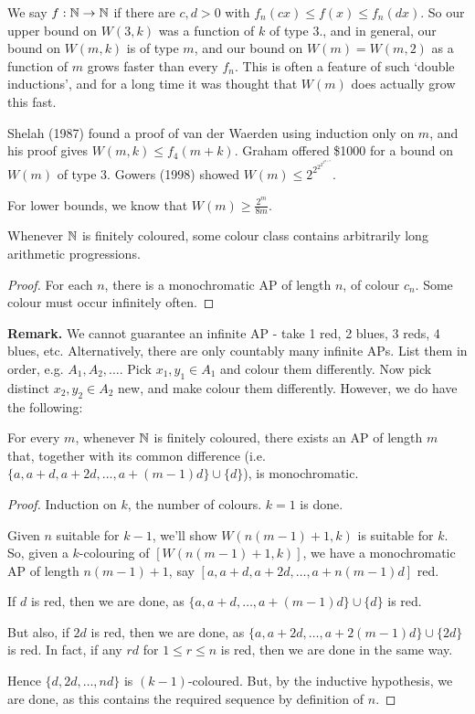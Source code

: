 \documentclass[10pt,a4paper]{article}
\begin{document}
We say $f:\mathbb{N} \to \mathbb{N}$ if there are $c, d >0$ with $f_n(cx) \leq f(x) \leq f_n(dx)$. So our upper bound on $W(3, k)$ was a function of $k$ of type 3., and in general, our bound on $W(m,k)$ is of type $m$, and our bound on $W(m) = W(m,2)$ as a function of $m$ grows faster than every $f_n$. This is often a feature of such `double inductions', and for a long time it was thought that $W(m)$ does actually grow this fast.

Shelah (1987) found a proof of van der Waerden using induction only on $m$, and his proof gives $W(m,k) \leq f_4(m+k)$. Graham offered \$1000 for a bound on $W(m)$ of type 3. Gowers (1998) showed $W(m) \leq 2^{2^{2^{2^{2^{m+9}}}}}$.

For lower bounds, we know that $W(m) \geq \frac{2^m}{8m}$.
\begin{corollary}
  Whenever $\mathbb{N}$ is finitely coloured, some colour class contains arbitrarily long arithmetic progressions.
\end{corollary}
\begin{proof}
  For each $n$, there is a monochromatic AP of length $n$, of colour $c_n$. Some colour must occur infinitely often.
\end{proof}
\textbf{Remark.} We cannot guarantee an infinite AP - take 1 red, 2 blues, 3 reds, 4 blues, etc. Alternatively, there are only countably many infinite APs. List them in order, e.g. $A_1, A_2, \ldots$. Pick $x_1, y_1 \in A_1$ and colour them differently. Now pick distinct $x_2, y_2 \in A_2$ new, and make colour them differently. However, we do have the following:
\begin{theorem}
  For every $m$, whenever $\mathbb{N}$ is finitely coloured, there exists an AP of length $m$ that, together with its common difference (i.e. $\{a, a+d, a+2d, \ldots, a+(m-1)d\}\cup\{d\}$), is monochromatic.
\end{theorem}
\begin{proof}
  Induction on $k$, the number of colours. $k=1$ is done.

  Given $n$ suitable for $k-1$, we'll show $W(n(m-1)+1, k)$ is suitable for $k$. So, given a $k$-colouring of $[W(n(m-1)+1, k)]$, we have a monochromatic AP of length $n(m-1)+1$, say $[a, a+d, a+2d, \ldots, a+n(m-1)d]$ red.

  If $d$ is red, then we are done, as $\{a, a+d, \ldots, a+(m-1)d\}\cup\{d\}$ is red.

  But also, if $2d$ is red, then we are done, as $\{a, a+2d, \ldots, a+2(m-1)d\}\cup\{2d\}$ is red. In fact, if any $rd$ for $1 \leq r\leq n$ is red, then we are done in the same way.

  Hence $\{d, 2d, \ldots, nd\}$ is $(k-1)$-coloured. But, by the inductive hypothesis, we are done, as this contains the required sequence by definition of $n$.
\end{proof}
\end{document}
